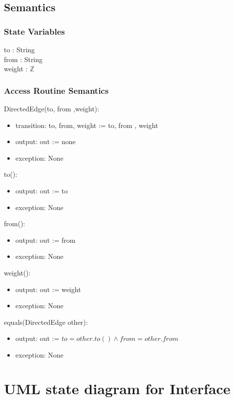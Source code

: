 \documentclass[12pt]{article}
\begin{document}
\subsection* {Semantics}

\subsubsection* {State Variables}

to : String\\
from : String\\
weight : $\mathbb{Z}$

\subsubsection* {Access Routine Semantics}

DirectedEdge(to, from ,weight):
\begin{itemize}
\item transition: to, from, weight := to, from , weight
\item output: out := none
\item exception: None
\end{itemize}

to():
\begin{itemize}
\item output: out := to
\item exception: None
\end{itemize}

from():
\begin{itemize}
\item output: out := from
\item exception: None
\end{itemize}

weight():
\begin{itemize}
\item output: out := weight
\item exception: None
\end{itemize}

equals(DirectedEdge other):
\begin{itemize}
\item output: out := $to = other.to() \land from = other.from$
\item exception: None
\end{itemize}

\newpage

\section* {UML state diagram for Interface}
\end{document}
